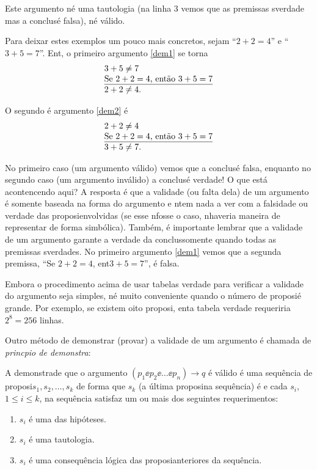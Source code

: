 Este argumento n\ao \'e uma tautologia (na linha 3 vemos que as premissas s\ao verdade mas a conclus\ao \'e falsa), n\ao \'e v\'alido.

Para deixar estes exemplos um pouco mais concretos, sejam \pp ``$2+2=4$'' e \qq ``$3+5=7$''. Ent\aoi, o primeiro argumento \ref{dem1} se torna 
\begin{eqnarray*}
\begin{tabular}{l}
$3+5\neq 7$ \\
\underline{Se $2+2=4$, ent\ao $3+5=7$} \\
$2+2\neq 4$.
\end{tabular}
\end{eqnarray*}

O segundo \'e argumento \ref{dem2} \'e
\begin{eqnarray*}
\begin{tabular}{l}
$2+2\neq 4$ \\
\underline{Se $2+2=4$, ent\ao $3+5=7$} \\
$3+5\neq 7$.
\end{tabular}
\end{eqnarray*}


No primeiro caso (um argumento v\'alido) vemos que a conclus\ao \'e falsa, enquanto no segundo caso (um argumento inv\'alido) a conclus\ao \'e verdade! O que est\'a acontencendo aqui? A resposta \'e que a validade (ou falta dela) de um argumento \'e somente baseada na forma do argumento e n\ao tem nada a ver com a falsidade ou verdade das proposi\coes envolvidas (se esse n\ao fosse o caso, n\ao haveria maneira de representar de forma simb\'olica). Tamb\'em, \'e importante lembrar que a validade de um argumento garante a verdade da conclus\ao somente quando todas as premissas s\ao verdades. No primeiro argumento \ref{dem1} vemos que a segunda premissa, ``Se $2+2=4$, ent\ao $3+5=7$'', \'e falsa.

Embora o procedimento acima de usar tabelas verdade para verificar a validade do argumento seja simples, n\ao \'e muito conveniente quando o n\'umero de proposi\coes \'e grande. Por exemplo, se existem oito proposi\cois, ent\ao a tabela verdade requeriria $2^8=256$ linhas.   

Outro m\'etodo de demonstrar (provar) a validade de um argumento \'e chamada de \emph{princ\ih pio de demonstra\cao}:

A demonstra\cao de que o argumento $(p_1\ee p_2\ee \ldots\ee p_n)\to q$ \'e v\'alido \'e uma sequ\^encia de proposi\coes $s_1,s_2,\ldots,s_k$ de forma que $s_k$ (a \'ultima proposi\cao na sequ\^encia) \'e \qq e cada $s_i$, $1\leq i \leq k$, na sequ\^encia satisfaz um ou mais dos seguintes requerimentos:  
\begin{enumerate}[{\bf a)}]
\item $s_i$ \'e uma das hip\'oteses.
\item $s_i$ \'e uma tautologia.
\item $s_i$ \'e uma consequ\^encia l\'ogica das proposi\coes anteriores da sequ\^encia.
\end{enumerate}

